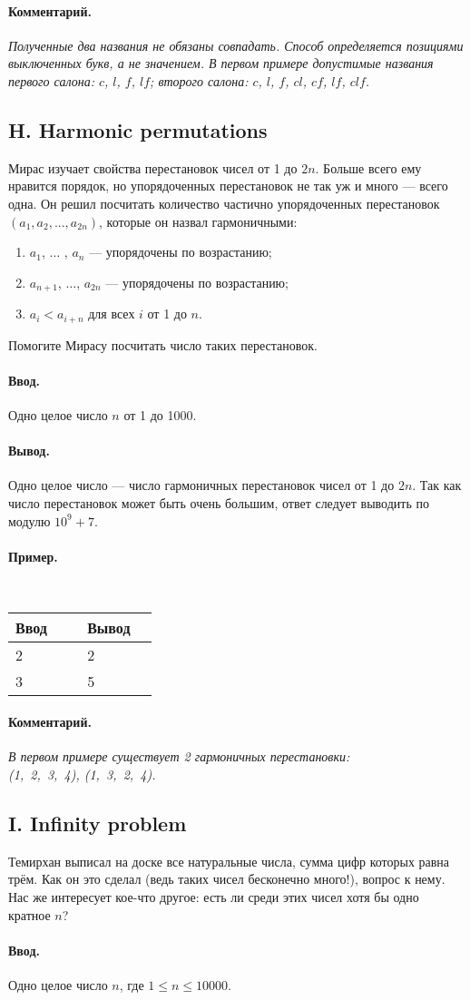\documentclass[12pt, a4paper]{article}
\newcommand{\informat}[1]
{
	\paragraph{Ввод.\\} #1
}
\newcommand{\outformat}[1]
{
	\paragraph{Вывод.\\} #1
}
\newcommand{\examplee}[4]
{
	\paragraph{Пример.\\}
	{\tt
	\begin{tabular}{|p{0.4\linewidth}|p{0.4\linewidth}|}
	\hline
	Ввод 	& Вывод  	\\
	\hline
	#1 		& #2 		\\
	\hline
	#3		& #4		\\
	\hline
	\end{tabular}
	}
}
\newcommand{\excomm}[1]
{
	\paragraph{Комментарий. \\}
	\textit{#1}
}
\begin{document}
\excomm{Полученные два названия не обязаны совпадать. Способ определяется позициями выключенных букв, а не значением. В первом примере допустимые названия первого салона: $c$, $l$, $f$, $lf$; второго салона: $c$, $l$, $f$, $cl$, $cf$, $lf$, $clf$.}



\subsection*{H. Harmonic permutations}

Мирас изучает свойства перестановок чисел от 1 до $2n$. Больше всего ему нравится порядок, но упорядоченных перестановок не так уж и много --- всего одна. Он решил посчитать количество частично упорядоченных перестановок $(a_1, a_2, ..., a_{2n})$, которые он назвал гармоничными:

\begin{enumerate}
\item $a_1$, $\dots$ , $a_n$ --- упорядочены по возрастанию;
\item $a_{n+1}$, $\dots$, $a_{2n}$ --- упорядочены по возрастанию;
\item $a_i < a_{i+n}$ для всех $i$ от 1 до $n$.
\end{enumerate}

Помогите Мирасу посчитать число таких перестановок.

\informat{Одно целое число $n$ от 1 до 1000.}

\outformat{Одно целое число --- число гармоничных перестановок чисел от 1 до $2n$. Так как число перестановок может быть очень большим, ответ следует выводить по модулю $10^9 + 7$.}

\examplee{2}{2}{3}{5}

\excomm{В первом примере существует 2 гармоничных перестановки:\\ \mbox{(1, 2, 3, 4)}, \mbox{(1, 3, 2, 4)}.}



\subsection*{I. Infinity problem}

Темирхан выписал на доске все натуральные числа, сумма цифр которых равна трём. Как он это сделал (ведь таких чисел бесконечно много!), вопрос к нему. Нас же интересует кое-что другое: есть ли среди этих чисел хотя бы одно кратное $n$?

\informat{Одно целое число $n$, где $1 \le n \le 10 000$.}
\end{document}
